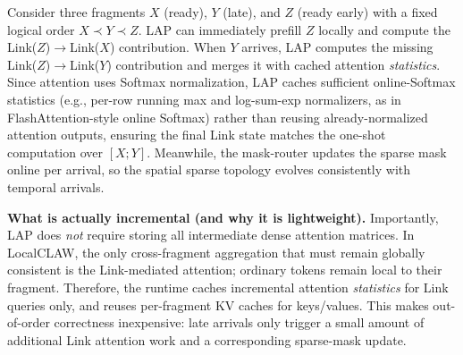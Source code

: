 Consider three fragments $X$ (ready), $Y$ (late), and $Z$ (ready early) with a fixed logical order $X \prec Y \prec Z$.
LAP can immediately prefill $Z$ locally and compute the Link($Z$)$\rightarrow$Link($X$) contribution.
When $Y$ arrives, LAP computes the missing Link($Z$)$\rightarrow$Link($Y$) contribution and merges it with cached attention \emph{statistics}.
Since attention uses Softmax normalization, LAP caches sufficient online-Softmax statistics (e.g., per-row running max and log-sum-exp normalizers, as in FlashAttention-style online Softmax) rather than reusing already-normalized attention outputs, ensuring the final Link state matches the one-shot computation over $[X;Y]$.
Meanwhile, the mask-router updates the sparse mask online per arrival, so the spatial sparse topology evolves consistently with temporal arrivals.

\textbf{What is actually incremental (and why it is lightweight).}
Importantly, LAP does \emph{not} require storing all intermediate dense attention matrices.
In LocalCLAW, the only cross-fragment aggregation that must remain globally consistent is the Link-mediated attention; ordinary tokens remain local to their fragment.
Therefore, the runtime caches incremental attention \emph{statistics} for Link queries only, and reuses per-fragment KV caches for keys/values.
This makes out-of-order correctness inexpensive: late arrivals only trigger a small amount of additional Link attention work and a corresponding sparse-mask update.

